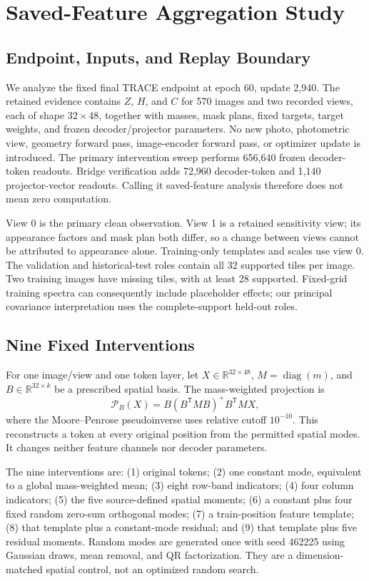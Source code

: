 \section{Saved-Feature Aggregation Study}\label{sec:aggregation}
\subsection{Endpoint, Inputs, and Replay Boundary}
We analyze the fixed final TRACE endpoint at epoch 60, update 2,940. The retained evidence contains $Z$, $H$, and $C$ for 570 images and two recorded views, each of shape $32\times48$, together with masses, mask plans, fixed targets, target weights, and frozen decoder/projector parameters. No new photo, photometric view, geometry forward pass, image-encoder forward pass, or optimizer update is introduced. The primary intervention sweep performs 656,640 frozen decoder-token readouts. Bridge verification adds 72,960 decoder-token and 1,140 projector-vector readouts. Calling it saved-feature analysis therefore does not mean zero computation.

View 0 is the primary clean observation. View 1 is a retained sensitivity view; its appearance factors and mask plan both differ, so a change between views cannot be attributed to appearance alone. Training-only templates and scales use view 0. The validation and historical-test roles contain all 32 supported tiles per image. Two training images have missing tiles, with at least 28 supported. Fixed-grid training spectra can consequently include placeholder effects; our principal covariance interpretation uses the complete-support held-out roles.

\subsection{Nine Fixed Interventions}
For one image/view and one token layer, let $X\in\mathbb{R}^{32\times48}$, $M=\operatorname{diag}(m)$, and $B\in\mathbb{R}^{32\times k}$ be a prescribed spatial basis. The mass-weighted projection is
\begin{equation}\label{eq:projection}
 \mathcal{P}_B(X)=B(B^{\mathsf T}MB)^+B^{\mathsf T}MX,
\end{equation}
where the Moore--Penrose pseudoinverse uses relative cutoff $10^{-10}$. This reconstructs a token at every original position from the permitted spatial modes. It changes neither feature channels nor decoder parameters.

The nine interventions are: (1) original tokens; (2) one constant mode, equivalent to a global mass-weighted mean; (3) eight row-band indicators; (4) four column indicators; (5) the five source-defined spatial moments; (6) a constant plus four fixed random zero-sum orthogonal modes; (7) a train-position feature template; (8) that template plus a constant-mode residual; and (9) that template plus five residual moments. Random modes are generated once with seed 462225 using Gaussian draws, mean removal, and QR factorization. They are a dimension-matched spatial control, not an optimized random search.

